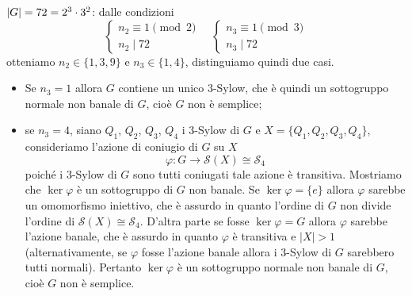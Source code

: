 \documentclass[11pt]{scrartcl}
\begin{document}
	\underline{$\left\lvert G \right\rvert = 72 = 2^3 \cdot 3^2$}: dalle condizioni 
	\[
	\begin{cases}
		n_2 \equiv 1 \pmod 2\\
		n_2 \mid 72
	\end{cases}\quad
	\begin{cases}
		n_3 \equiv 1 \pmod 3\\
		n_3 \mid 72
	\end{cases}
	\]
	otteniamo $n_2 \in \{1, 3, 9\}$ e $n_3 \in \{1, 4\}$, distinguiamo quindi
	due casi.
	\begin{itemize}
		\item Se $n_3 = 1$ allora $G$ contiene un unico 3-Sylow, che è quindi un
		sottogruppo normale non banale di $G$, cioè $G$ non è semplice;
		\item se $n_3= 4$, siano $Q_1$, $Q_2$, $Q_3$, $Q_4$ i 3-Sylow di $G$ e 
		$X = \{Q_1, Q_2, Q_3, Q_4\}$, consideriamo l'azione di coniugio di $G$ su $X$
		\[
		\varphi: G\longrightarrow \mathcal{S}(X) \cong \mathcal{S}_4
		\]
		poiché i 3-Sylow di $G$ sono tutti coniugati tale azione è transitiva.
		Mostriamo che $\ker \varphi$ è un sottogruppo di $G$ non banale. Se $\ker\varphi
		= \{e\}$ allora $\varphi$ sarebbe un omomorfismo iniettivo, che è assurdo
		in quanto l'ordine di $G$ non divide l'ordine di $\mathcal{S}(X) \cong \mathcal{S}_4$. D'altra
		parte se fosse $\ker\varphi = G$ allora $\varphi$ sarebbe l'azione banale,
		che è assurdo in quanto $\varphi$ è transitiva e $|X| > 1$ (alternativamente,
		se $\varphi$ fosse l'azione banale allora i 3-Sylow di $G$ sarebbero tutti
		normali). Pertanto $\ker\varphi$ è un sottogruppo normale non banale di $G$,
		cioè $G$ non è semplice.
	\end{itemize}
	
\end{document}
